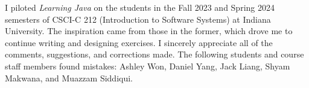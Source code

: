 %
%


I piloted \emph{Learning Java} on the students in the Fall 2023 and Spring 2024 semesters of CSCI-C 212 (Introduction to Software Systems) at Indiana University. The inspiration came from those in the former, which drove me to continue writing and designing exercises. I sincerely appreciate all of the comments, suggestions, and corrections made. The following students and course staff members found mistakes: Ashley Won, Daniel Yang, Jack Liang, Shyam Makwana, and Muazzam Siddiqui.

